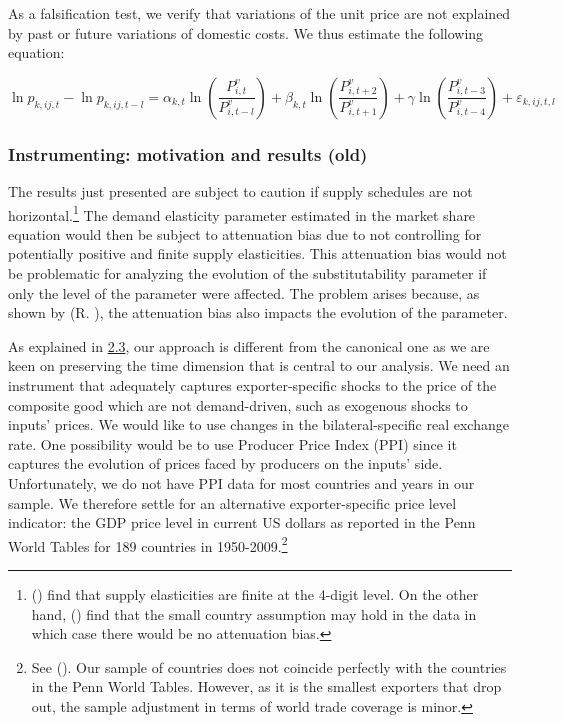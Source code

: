 \documentclass[12pt,twoside,a4paper,notitlepage]{article}
\begin{document}
{As a falsification test, we verify that variations of the unit price are not explained by past or future variations of domestic costs.
We thus estimate the following equation:

\[\ln {{p}_{k,ij,t}}-\ln {{p}_{k,ij,t-l}}={{\alpha }_{k,t}}\ln \left( \frac{P_{i,t}^{v}}{P_{i,t-l}^{v}} \right)+{{\beta }_{k,t}}\ln \left( \frac{P_{i,t+2}^{v}}{P_{i,t+1}^{v}} \right)+\gamma \ln \left( \frac{P_{i,t-3}^{v}}{P_{i,t-4}^{v}} \right)+{{\varepsilon }_{k,ij,t,l}}\] 

\subsubsection{ Instrumenting: motivation and results (old)\label{mark-2.3.3.}}

The results just presented are subject to caution if supply schedules are not horizontal.\footnote{(\cite{Broda2006}) find that supply elasticities are finite at the 4-digit level.
On the other hand, (\cite{Magee2008}) find that the small country assumption may hold in the data in which case there would be no attenuation bias.
} The demand elasticity parameter estimated in the market share equation would then be subject to attenuation bias due to not controlling for potentially positive and finite supply elasticities.
This attenuation bias would not be problematic for analyzing the evolution of the substitutability parameter if only the level of the parameter were affected.
The problem arises because, as shown by (R.
\cite{Feenstra 1994}), the attenuation bias also impacts the evolution of the parameter.

As explained in {\hyperref[ref-001]{2.3}}, our approach is different from the canonical one as we are keen on preserving the time dimension that is central to our analysis.
We need an instrument that adequately captures exporter-specific shocks to the price of the composite good which are not demand-driven, such as exogenous shocks to inputs' prices.
We would like to use changes in the bilateral-specific real exchange rate.
One possibility would be to use Producer Price Index (PPI) since it captures the evolution of prices faced by producers on the inputs' side.
Unfortunately, we do not have PPI data for most countries and years in our sample.
We therefore settle for an alternative exporter-specific price level indicator: the GDP price level in current US dollars as reported in the Penn World Tables for 189 countries in 1950-2009.\footnote{See (\cite{Heston 2011}).
Our sample of countries does not coincide perfectly with the countries in the Penn World Tables.
However, as it is the smallest exporters that drop out, the sample adjustment in terms of world trade coverage is minor.
}

}
\end{document}
